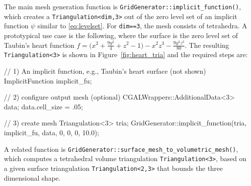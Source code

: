 \documentclass{ansarticle-preprint}
\begin{document}
The main mesh generation function is
\texttt{GridGenerator::implicit\_function()}, which creates a \texttt{Triangulation<dim,3>} out of the zero level set of an implicit function $\psi$ similar to \eqref{eq:levelset}.
For \texttt{dim==3}, the mesh consists of tetrahedra. A prototypical use case is the following, where the surface is the zero level set of Taubin's heart function $f=\bigl ( x^2 + \frac{9y^2}{4} +z^2 -1 \bigr ) -x^2 z^3 - \frac{9y^2z^3}{80}$. The resulting \texttt{Triangulation<3>} is shown in Figure~\ref{fig:heart_tria}
and the required steps are:
\begin{c++}
// 1) An implicit function, e.g., Taubin's heart surface (not shown)
ImplicitFunction implicit_fu;

// 2) configure output mesh (optional)
CGALWrappers::AdditionalData<3> data; data.cell_size = .05;

// 3) create mesh
Triangulation<3> tria;
GridGenerator::implicit_function(tria, implicit_fu, data, {0, 0, 0}, 10.0);
\end{c++}

A related function is
\texttt{GridGenerator::surface\_mesh\_to\_volumetric\_mesh()}, which
computes a tetrahedral volume triangulation \texttt{Triangulation<3>}, based on a
given surface triangulation \texttt{Triangulation<2,3>} that bounds
the three dimensional shape.
\end{document}
